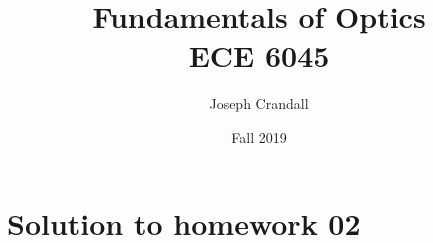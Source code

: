 

\usepackage{subfiles}
\usepackage{color,soul}
\usepackage{siunitx}

\title{Fundamentals of Optics\\
\large ECE 6045}
\author{Joseph Crandall}
\date{Fall 2019}


\maketitle


\section{Solution to homework 02}


%

%

%


%


